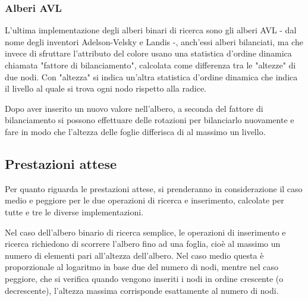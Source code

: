 \documentclass[a4paper,12pt]{article}
\begin{document}
    \subsubsection{Alberi AVL}
    L'ultima implementazione degli alberi binari di ricerca sono gli alberi AVL - dal nome degli inventori
    Adelson-Velsky e Landis -, anch'essi alberi bilanciati, ma che invece di sfruttare l'attributo del colore usano una
    statistica d'ordine dinamica chiamata "fattore di bilanciamento", calcolata come differenza tra le "altezze" di due
    nodi. Con "altezza" si indica un'altra statistica d'ordine dinamica che indica il livello al quale si trova ogni
    nodo rispetto alla radice.

    Dopo aver inserito un nuovo valore nell'albero, a seconda del fattore di bilanciamento si possono effettuare delle
    rotazioni per bilanciarlo nuovamente e fare in modo che l'altezza delle foglie differisca di al massimo un livello.

    \subsection{Prestazioni attese}
    Per quanto riguarda le prestazioni attese, si prenderanno in considerazione il caso medio e peggiore per le due
    operazioni di ricerca e inserimento, calcolate per tutte e tre le diverse implementazioni.

    Nel caso dell'albero binario di ricerca semplice, le operazioni di inserimento e ricerca richiedono di scorrere
    l'albero fino ad una foglia, cioè al massimo un numero di elementi pari all'altezza dell'albero.
    Nel caso medio questa è proporzionale al logaritmo in base due del numero di nodi, mentre nel caso peggiore,
    che si verifica quando vengono inseriti i nodi in ordine crescente (o decrescente), l'altezza massima corrisponde
    esattamente al numero di nodi.
\end{document}
